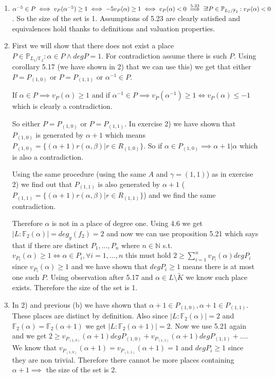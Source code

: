 \documentclass[12pt, a4paper]{article}
\begin{document}
\section{}
\begin{enumerate}[label=(\alph*)]
\item $\alpha^{-5} \in P \iff v_P(\alpha^{-5})\geq 1 \iff -5v_P(\alpha)\geq 1 \iff v_P(\alpha) < 0 \stackrel{\text{5.23}}{\implies} \\\exists! P \in \mathbb{P}_{L_1/\mathbb{F}_2} : v_P(\alpha)<0$. So the size of the set is 1. Assumptions of 5.23 are clearly satisfied and equivalences hold thanks to definitions and valuation properties.

\item First we will show that there does not exist a place $P \in \mathbb{P}_{L_1/\mathbb{F}_2}: \alpha \in P \land deg P = 1$. For contradiction assume there is such $P$. Using corollary 5.17 (we have shown in 2) that we can use this) we get that either $P = P_{(1,0)}$ or $P = P_{(1,1)}$ or $\alpha^{-1} \in P$. 

If $\alpha \in P \implies v_P(\alpha)\geq 1$ and if $\alpha^{-1} \in P \implies v_P(\alpha^{-1}) \geq 1 \iff v_P(\alpha) \leq -1$ which is clearly a contradiction. 

So either $P = P_{(1,0)}$ or $P = P_{(1,1)}$. In exercise 2) we have shown that $P_{(1,0)}$ is generated by $\alpha+1$ which means $P_{(1,0)}=\{(\alpha+1)r(\alpha,\beta)|r\in R_{(1,0)}\}$. So if $\alpha \in P_{(1,0)} \implies \alpha + 1 | \alpha$ which is also a contradiction. 

Using the same procedure (using the same $A$ and $\gamma =(1,1)$) as in exercise 2) we find out that $P_{(1,1)}$ is also generated by $\alpha+1$ ($P_{(1,1)}=\{(\alpha+1)r(\alpha,\beta)|r\in R_{(1,1)}\}$) and we find the same contradiction.

Therefore $\alpha$ is not in a place of degree one. Using 4.6 we get $|L:\mathbb{F}_2(\alpha)|=deg_y(f_2)=2$ and now we can use proposition 5.21 which says that if there are distinct $P_1,\dots,P_n$ where $n\in \mathbb{N}$ s.t. $v_{P_i}(\alpha)\geq 1 \iff \alpha \in P_i, \forall i=1,\dots,n$ this must hold $2\geq \sum_{i=1}^n v_{P_i}(\alpha) deg P_i$ since $v_{P_i}(\alpha)\geq 1$ and we have shown that $degP_i \geq 1$ means there is at most one such $P$. Using observation after 5.17 and $\alpha \in L \setminus \tilde{K}$ we know such place exists. Therefore the size of the set is 1.

\item In 2) and previous (b) we have shown that $\alpha+1 \in P_{(1,0)}, \alpha+1 \in P_{(1,1)}$. These places are distinct by definition. Also since $|L:\mathbb{F}_2(\alpha)| = 2$ and $\mathbb{F}_2(\alpha) = \mathbb{F}_2(\alpha+1)$ we get $|L:\mathbb{F}_2(\alpha+1)| = 2$. Now we use 5.21 again and we get $2\geq v_{P_{(1,0)}}(\alpha+1)degP_{(1,0)} + v_{P_{(1,1)}}(\alpha+1)degP_{(1,1)} + \dots$. We know that $v_{P_{(1,0)}}(\alpha+1) = v_{P_{(1,1)}}(\alpha+1) = 1$ and $deg P_i \geq 1$ since they are non trivial. Therefore there cannot be more places containing $\alpha+1 \implies$ the size of the set is 2.


\end{enumerate}
\end{document}
